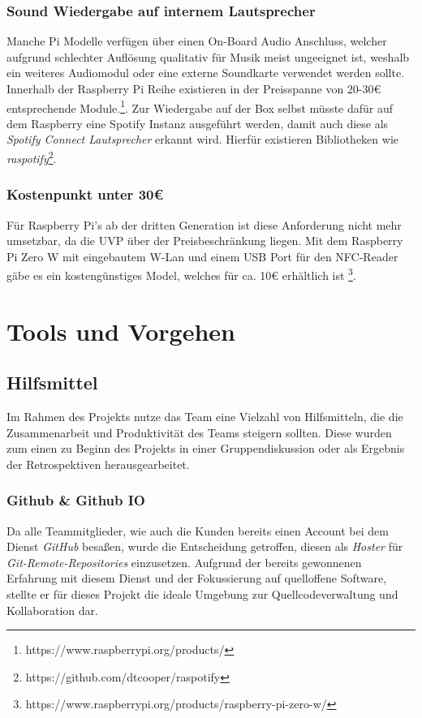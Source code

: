 \documentclass[10pt, a4paper]{article}
\begin{document}
\begin{onehalfspace}
\subsubsection*{Sound Wiedergabe auf internem Lautsprecher}
Manche Pi Modelle verfügen über einen On-Board Audio Anschluss, welcher aufgrund schlechter Auflösung qualitativ für Musik meist ungeeignet ist, weshalb ein weiteres Audiomodul oder eine externe Soundkarte verwendet werden sollte.
Innerhalb der Raspberry Pi Reihe existieren in der Preisspanne von 20-30€ entsprechende Module.\footnote{https://www.raspberrypi.org/products/}.
Zur Wiedergabe auf der Box selbst müsste dafür auf dem Raspberry eine Spotify Instanz ausgeführt werden, damit auch diese als \textit{Spotify Connect Lautsprecher} erkannt wird.
Hierfür existieren Bibliotheken wie \textit{raspotify}\footnote{https://github.com/dtcooper/raspotify}.

\subsubsection*{Kostenpunkt unter 30€}
Für Raspberry Pi's ab der dritten Generation ist diese Anforderung nicht mehr umsetzbar, da die UVP über der Preisbeschränkung liegen.
Mit dem Raspberry Pi Zero W mit eingebautem W-Lan und einem USB Port für den NFC-Reader gäbe es ein kostengünstiges Model, welches für ca. 10€ erhältlich ist \footnote{https://www.raspberrypi.org/products/raspberry-pi-zero-w/}.

\section{Tools und Vorgehen}
  \subsection{Hilfsmittel}
      Im Rahmen des Projekts nutze das Team eine Vielzahl von Hilfsmitteln, die die Zusammenarbeit und Produktivität des Teams steigern sollten.
      Diese wurden zum einen zu Beginn des Projekts in einer Gruppendiskussion oder als Ergebnis der Retrospektiven herausgearbeitet.

      \subsubsection{Github \& Github IO}
      Da alle Teammitglieder, wie auch die Kunden bereits einen Account bei dem Dienst \textit{GitHub} besaßen, wurde die Entscheidung getroffen, diesen als \textit{Hoster} für \textit{Git-Remote-Repositories} einzusetzen.
      Aufgrund der bereits gewonnenen Erfahrung mit diesem Dienst und der Fokussierung auf quelloffene Software, stellte er für dieses Projekt die ideale Umgebung zur Quellcodeverwaltung und Kollaboration dar.


\end{onehalfspace}
\end{document}
